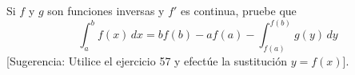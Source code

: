 \item Si $f$ y $g$ son funciones inversas y $f'$ es continua, pruebe que
    \[ \int_{a}^{b} f(x) \, dx = b f(b) - a f(a) - \int_{f(a)}^{f(b)} g(y) \, dy \]
    [Sugerencia: Utilice el ejercicio 57 y efectúe la sustitución $y = f(x)$].
